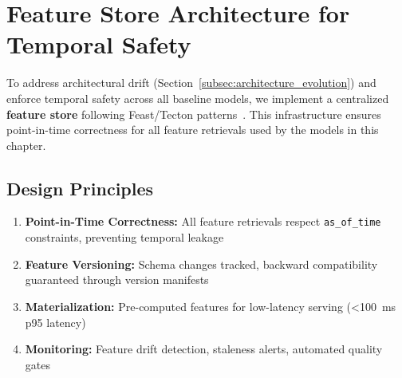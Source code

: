 

\section{Feature Store Architecture for Temporal Safety}
\label{subsec:feature_store_proposal}

To address architectural drift (Section~\ref{subsec:architecture_evolution}) and enforce temporal safety across all baseline models, we implement a centralized \textbf{feature store} following Feast/Tecton patterns~\cite{feast2021, tecton2022}. This infrastructure ensures point-in-time correctness for all feature retrievals used by the models in this chapter.

\subsection{Design Principles}

\begin{enumerate}
    \item \textbf{Point-in-Time Correctness:} All feature retrievals respect \texttt{as\_of\_time} constraints, preventing temporal leakage
    \item \textbf{Feature Versioning:} Schema changes tracked, backward compatibility guaranteed through version manifests
    \item \textbf{Materialization:} Pre-computed features for low-latency serving (\SI{<100}{ms} p95 latency)
    \item \textbf{Monitoring:} Feature drift detection, staleness alerts, automated quality gates
\end{enumerate}

